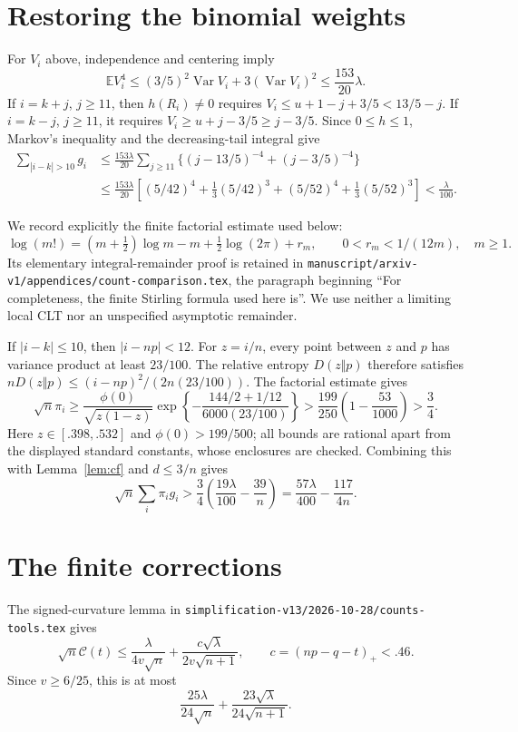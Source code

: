 \documentclass[11pt]{article}
\newcommand{\E}{\mathbb E}\newcommand{\Pp}{\mathbb P}
\begin{document}
\section{Restoring the binomial weights}
For $V_i$ above, independence and centering imply
\[
 \E V_i^4\le(3/5)^2\operatorname{Var}V_i
                +3(\operatorname{Var}V_i)^2
             \le\frac{153}{20}\lambda.
\]
If $i=k+j$, $j\ge11$, then $h(R_i)\ne0$ requires
$V_i\le u+1-j+3/5<13/5-j$.
If $i=k-j$, $j\ge11$, it requires $V_i\ge u+j-3/5\ge j-3/5$.
Since $0\le h\le1$, Markov's inequality and the decreasing-tail integral give
\begin{align*}
 \sum_{|i-k|>10}g_i
 &\le\frac{153\lambda}{20}
       \sum_{j\ge11}\{(j-13/5)^{-4}+(j-3/5)^{-4}\}\\
 &\le\frac{153\lambda}{20}\left[
 (5/42)^4+\frac13(5/42)^3+(5/52)^4+\frac13(5/52)^3\right]
 <\frac\lambda{100}.
\end{align*}

We record explicitly the finite factorial estimate used below:
\[
 \log(m!)=(m+\tfrac12)\log m-m+\tfrac12\log(2\pi)+r_m,
                  \qquad0<r_m<1/(12m),\quad m\ge1.
\]
Its elementary integral-remainder proof is retained in
\texttt{manuscript/arxiv-v1/appendices/count-comparison.tex}, the paragraph
beginning ``For completeness, the finite Stirling formula used here is''.
We use neither a limiting local CLT nor an unspecified asymptotic remainder.

If $|i-k|\le10$, then $|i-np|<12$. For $z=i/n$, every point between
$z$ and $p$ has variance product at least $23/100$. The relative entropy
$D(z\Vert p)$ therefore satisfies
$nD(z\Vert p)\le(i-np)^2/(2n(23/100))$.
The factorial estimate gives
\[
 \sqrt n\pi_i\ge\frac{\phi(0)}{\sqrt{z(1-z)}}
 \exp\left\{-\frac{144/2+1/12}{6000(23/100)}\right\}
 >\frac{199}{250}\left(1-\frac{53}{1000}\right)>\frac34.
\]
Here $z\in[.398,.532]$ and $\phi(0)>199/500$; all bounds are rational
apart from the displayed standard constants, whose enclosures are checked.
Combining this with Lemma~\ref{lem:cf} and $d\le3/n$ gives
\begin{equation}\label{eq:weightedloss}
 \sqrt n\sum_i\pi_i g_i
    >\frac34\left(\frac{19\lambda}{100}-\frac{39}{n}\right)
     =\frac{57\lambda}{400}-\frac{117}{4n}.
\end{equation}

\section{The finite corrections}
The signed-curvature lemma in
\texttt{simplification-v13/2026-10-28/counts-tools.tex} gives
\[
 \sqrt n\mathcal C(t)\le\frac\lambda{4v\sqrt n}
         +\frac{c\sqrt\lambda}{2v\sqrt{n+1}},\qquad
 c=(np-q-t)_+<.46.
\]
Since $v\ge6/25$, this is at most
\begin{equation}\label{eq:curvature}
          \frac{25\lambda}{24\sqrt n}
               +\frac{23\sqrt\lambda}{24\sqrt{n+1}}.
\end{equation}
\end{document}
